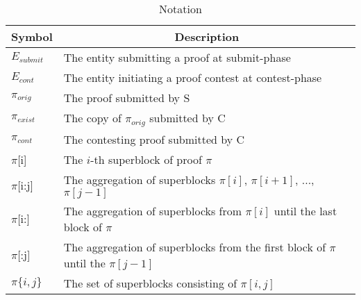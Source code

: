 \begin{table}[]
\begin{tabular}{ll}
\hline
\multicolumn{1}{|c|}{Symbol} & \multicolumn{1}{c|}{Description}                       \\ \hline
$E_{submit}$                   & The entity submitting a proof at submit-phase          \\
$E_{cont}$                     & The entity initiating a proof contest at contest-phase \\
$\pi_{orig}$                 & The proof submitted by S                               \\
$\pi_{exist}$                & The copy of $\pi_{orig}$ submitted by C                \\
$\pi_{cont}$                 & The contesting proof submitted by C                    \\
$\pi${[}i{]}                 & The $i$-th superblock of proof $\pi$                  \\
$\pi${[}i:j{]} & The aggregation of superblocks $\pi[i]$, $\pi[i+1]$, ..., $\pi[j-1]$              \\
$\pi${[}i:{]}  & The aggregation of superblocks from $\pi[i]$ until the last block of $\pi$        \\
$\pi${[}:j{]}  & The aggregation of superblocks from the first block of $\pi$ until the $\pi[j-1]$ \\
$\pi\{i, j\}$                & The set of superblocks consisting of $\pi[i,j]$
\end{tabular}
\caption{Notation}
\label{table:notation}
\end{table}
